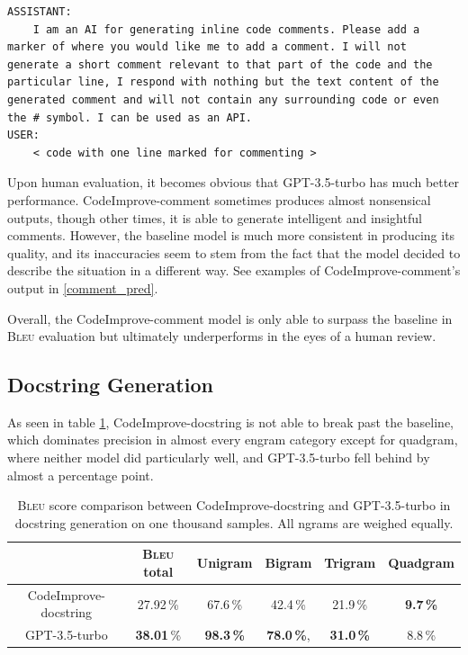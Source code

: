     \begin{lstlisting}[caption={Prompt used for sampling docstrings from GPT-3.5-turbo.}, label={lst:comment_prompt}, numbers=none]
ASSISTANT:
    I am an AI for generating inline code comments. Please add a marker of where you would like me to add a comment. I will not generate a short comment relevant to that part of the code and the particular line, I respond with nothing but the text content of the generated comment and will not contain any surrounding code or even the # symbol. I can be used as an API.
USER:
    < code with one line marked for commenting >
    \end{lstlisting}

    Upon human evaluation, it becomes obvious that GPT-3.5-turbo has much better performance. CodeImprove-comment sometimes produces almost nonsensical outputs, though other times, it is able to generate intelligent and insightful comments. However, the baseline model is much more consistent in producing its quality, and its inaccuracies seem to stem from the fact that the model decided to describe the situation in a different way. See examples of CodeImprove-comment's output in \ref{comment_pred}.

    Overall, the CodeImprove-comment model is only able to surpass the baseline in \textsc{Bleu} evaluation but ultimately underperforms in the eyes of a human review.
    
    \subsection{Docstring Generation}
    As seen in table \ref{tab:docstring_perf}, CodeImprove-docstring is not able to break past the baseline, which dominates precision in almost every engram category except for quadgram, where neither model did particularly well, and GPT-3.5-turbo fell behind by almost a percentage point.
    
        \begin{table}[H]
            \centering
            \begin{tabular}{|c||c|c|c|c|c|}
            \hline
             & \textsc{Bleu} total & Unigram & Bigram & Trigram & Quadgram \\
            \hline
            \hline
            CodeImprove-docstring & 27.92\,\% & 67.6\,\% & 42.4\,\% & 21.9\,\% & \textbf{9.7\,\%} \\
            \hline
            GPT-3.5-turbo & \textbf{38.01}\,\% & \textbf{98.3\,\%} & \textbf{78.0\,\%}, & \textbf{31.0\,\%} & 8.8\,\% \\
            \hline
            \end{tabular}
            \caption{\textsc{Bleu} score comparison between CodeImprove-docstring and GPT-3.5-turbo in docstring generation on one thousand samples. All ngrams are weighed equally.}
            \label{tab:docstring_perf}
        \end{table}

